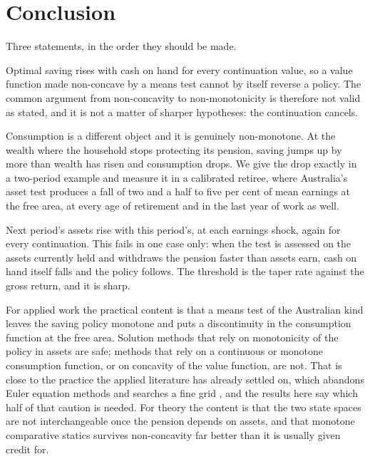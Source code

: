 \section{Conclusion}

Three statements, in the order they should be made.

Optimal saving rises with cash on hand for every continuation value, so a value function made
non-concave by a means test cannot by itself reverse a policy. The common argument from
non-concavity to non-monotonicity is therefore not valid as stated, and it is not a matter of
sharper hypotheses: the continuation cancels.

Consumption is a different object and it is genuinely non-monotone. At the wealth where the
household stops protecting its pension, saving jumps up by more than wealth has risen and
consumption drops. We give the drop exactly in a two-period example and measure it in a calibrated
retiree, where Australia's asset test produces a fall of two and a half to five per cent of mean
earnings at the free area, at every age of retirement and in the last year of work as well.

Next period's assets rise with this period's, at each earnings shock, again for every continuation.
This fails in one case only: when the test is assessed on the assets currently held and withdraws
the pension faster than assets earn, cash on hand itself falls and the policy follows. The
threshold is the taper rate against the gross return, and it is sharp.

For applied work the practical content is that a means test of the Australian kind leaves the
saving policy monotone and puts a discontinuity in the consumption function at the free area.
Solution methods that rely on monotonicity of the policy in assets are safe; methods that rely on a
continuous or monotone consumption function, or on concavity of the value function, are not. That
is close to the practice the applied literature has already settled on, which abandons Euler
equation methods and searches a fine grid \citep{Wellschmied2021,GarstenauerSiassi2024}, and the
results here say which half of that caution is needed. For
theory the content is that the two state spaces are not interchangeable once the pension depends on
assets, and that monotone comparative statics survives non-concavity far better than it is usually
given credit for.
